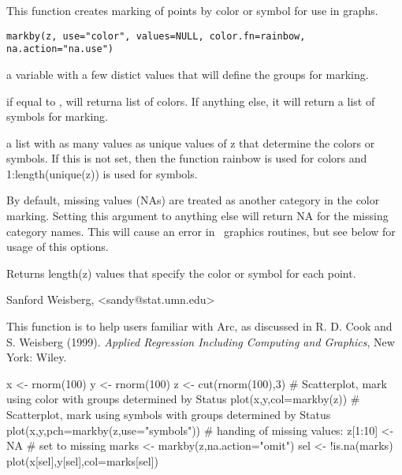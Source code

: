 \begin{Description}\relax
This function creates marking of points by color or symbol for use in graphs.
\end{Description}
\begin{Usage}
\begin{verbatim}
markby(z, use="color", values=NULL, color.fn=rainbow, na.action="na.use")
\end{verbatim}
\end{Usage}
\begin{Arguments}
\begin{ldescription}
\item[\code{z}] a variable with a few distict values that will define the groups for
marking.
\item[\code{use}] if equal to , will returna list of colors.  If
anything else, it will return a list of symbols for marking.
\item[\code{values}] a list with as many values as unique values of z that determine
the colors or symbols.  If this is not set, then the function rainbow is used
for colors and 1:length(unique(z)) is used for symbols.
\item[\code{color.fn}] 
\item[\code{na.action}] By default, missing values (NAs) are treated as another
category in the color marking.  Setting this argument to anything else will
return NA for the missing category names.  This will cause an error in \R\
graphics routines, but see below for usage of this options.
\end{ldescription}
\end{Arguments}
\begin{Value}
Returns length(z) values that specify the color or symbol for each point.
\end{Value}
\begin{Author}\relax
Sanford Weisberg, <sandy@stat.umn.edu>
\end{Author}
\begin{References}\relax
This function is to help users familiar with Arc, as discussed in
R. D. Cook and S. Weisberg (1999).  \emph{Applied Regression Including
Computing and Graphics}, New York:  Wiley.
\end{References}
\begin{Examples}
\begin{ExampleCode}
  x <- rnorm(100)
  y <- rnorm(100)
  z <- cut(rnorm(100),3)
# Scatterplot, mark using color with groups determined by Status
  plot(x,y,col=markby(z))
# Scatterplot, mark using symbols with groups determined by Status
  plot(x,y,pch=markby(z,use="symbols"))
# handing of missing values:
  z[1:10] <- NA   # set to missing
  marks <- markby(z,na.action="omit")
  sel <- !is.na(marks)
  plot(x[sel],y[sel],col=marks[sel])
\end{ExampleCode}
\end{Examples}

